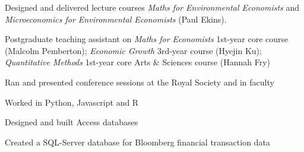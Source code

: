 \documentclass[a4paper]{deedy-resume} %
\begin{document}
\begin{minipage}[t]{0.66\textwidth}
\begin{tightitemize}
    \end{tightitemize}
    
    \sectionspace %
    

    \begin{tightitemize}
        \item Designed and delivered lecture courses \textit{Maths for Environmental Economists} and \textit{Microeconomics for Environmental Economists} (Paul Ekins).
        \item Postgraduate teaching assistant on \textit{Maths for Economists} 1st-year core course (Malcolm Pemberton);
         \textit{Economic Growth} 3rd-year course (Hyejin Ku);
         \textit{Quantitative Methods} 1st-year core Arts \& Sciences course (Hannah Fry)
        \item Ran and presented conference sessions at the Royal Society and in faculty
        \item Worked in Python, Javascript and R
    \end{tightitemize}

    \sectionspace %



    \begin{tightitemize}
        \item Designed and built Access databases
    \end{tightitemize}

    \sectionspace %



    \begin{tightitemize}
        \item Created a SQL-Server database for Bloomberg financial transaction data
    \end{tightitemize}


\end{minipage}
\end{document}
